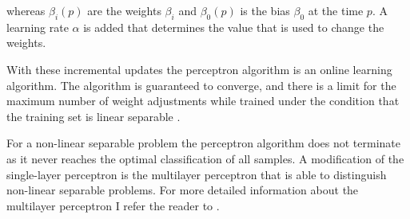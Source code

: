 whereas $\beta_i(p)$ are the weights $\beta_i$ and $\beta_0(p)$ is the bias $\beta_0$ at the time $p$.
A learning rate $\alpha$ is added that determines the value that is used to change the weights.

With these incremental updates the perceptron algorithm is an online learning algorithm.
The algorithm is guaranteed to converge, and there is a limit for the maximum number of weight adjustments while trained under the condition that the training set is linear separable \cite{Wikipedia2016Perceptron}. %

For a non-linear separable problem the perceptron algorithm does not terminate as it never reaches the optimal classification of all samples. %
A modification of the single-layer perceptron is the multilayer perceptron that is able to distinguish non-linear separable problems.
For more detailed information about the multilayer perceptron I refer the reader to \cite{Wikipedia2017MultilayerPerceptron}.











